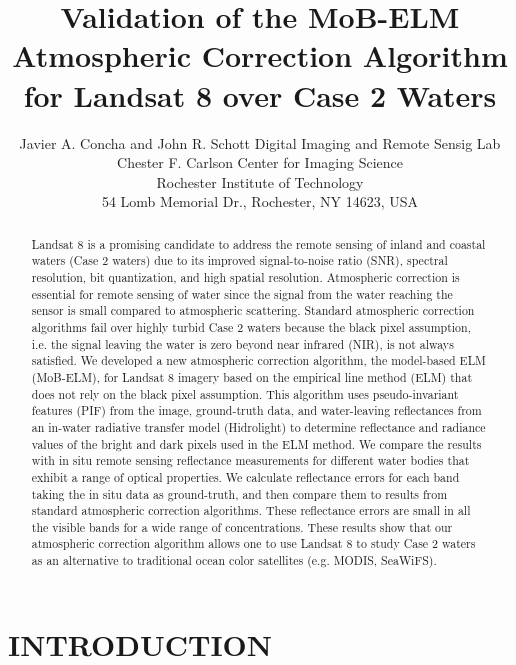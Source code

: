 \documentclass[]{spie}  %
\title{Validation of the MoB-ELM Atmospheric Correction Algorithm for Landsat 8 over Case 2 Waters}
\author{Javier A. Concha and John R. Schott
\skiplinehalf
Digital Imaging and Remote Sensig Lab\\Chester F. Carlson Center for Imaging Science\\Rochester Institute of Technology\\ 54 Lomb Memorial Dr., Rochester, NY 14623, USA\\
}
\begin{document}
 
  \maketitle 

\begin{abstract}
Landsat 8 is a promising candidate to address the remote sensing of inland and coastal waters (Case 2 waters) due to its improved signal-to-noise ratio (SNR), spectral resolution, bit quantization, and high spatial resolution. Atmospheric correction is essential for remote sensing of water since the signal from the water reaching the sensor is small compared to atmospheric scattering. Standard atmospheric correction algorithms fail over highly turbid Case 2 waters because the black pixel assumption, i.e. the signal leaving the water is zero beyond near infrared (NIR), is not always satisfied. We developed a new atmospheric correction algorithm, the model-based ELM (MoB-ELM), for Landsat 8 imagery based on the empirical line method (ELM) that does not rely on the black pixel assumption. This algorithm uses pseudo-invariant features (PIF) from the image, ground-truth data, and water-leaving reflectances from an in-water radiative transfer model (Hidrolight) to determine reflectance and radiance values of the bright and dark pixels used in the ELM method.  We compare the results with in situ remote sensing reflectance measurements for different water bodies that exhibit a range of optical properties. We calculate reflectance errors for each band taking the in situ data as ground-truth, and then compare them to results from standard atmospheric correction algorithms. These reflectance errors are small in all the visible bands for a wide range of concentrations. These results show that our atmospheric correction algorithm allows one to use Landsat 8 to study Case 2 waters as an alternative to traditional ocean color satellites (e.g. MODIS, SeaWiFS). 
\end{abstract}



\section{INTRODUCTION}
\label{sec:intro}  %
\end{document}
